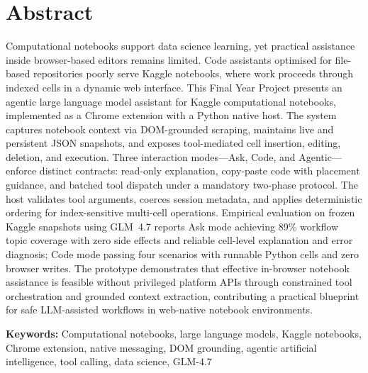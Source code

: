 \chapter*{Abstract}
\vspace{-\baselineskip}
\noindent Computational notebooks support data science learning, yet practical assistance inside browser-based editors remains limited. Code assistants optimised for file-based repositories poorly serve Kaggle notebooks, where work proceeds through indexed cells in a dynamic web interface. This Final Year Project presents an agentic large language model assistant for Kaggle computational notebooks, implemented as a Chrome extension with a Python native host. The system captures notebook context via DOM-grounded scraping, maintains live and persistent JSON snapshots, and exposes tool-mediated cell insertion, editing, deletion, and execution. Three interaction modes---Ask, Code, and Agentic---enforce distinct contracts: read-only explanation, copy-paste code with placement guidance, and batched tool dispatch under a mandatory two-phase protocol. The host validates tool arguments, coerces session metadata, and applies deterministic ordering for index-sensitive multi-cell operations. Empirical evaluation on frozen Kaggle snapshots using GLM~4.7 reports Ask mode achieving 89\% workflow topic coverage with zero side effects and reliable cell-level explanation and error diagnosis; Code mode passing four scenarios with runnable Python cells and zero browser writes. The prototype demonstrates that effective in-browser notebook assistance is feasible without privileged platform APIs through constrained tool orchestration and grounded context extraction, contributing a practical blueprint for safe LLM-assisted workflows in web-native notebook environments.

\vspace{1.5ex}
\noindent\textbf{Keywords:} Computational notebooks, large language models, Kaggle notebooks, Chrome extension, native messaging, DOM grounding, agentic artificial intelligence, tool calling, data science, GLM-4.7
